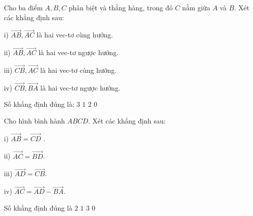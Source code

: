 \begin{ex}%
	Cho ba điểm $A, B,C$ phân biệt và thẳng hàng, trong đó $C$ nằm giữa $A$ và $B$. Xét các khẳng định sau:
	
	i) $\vec{AB}, \vec{AC}$ là hai vec-tơ cùng hướng.
	
	ii) $\vec{AB}, \vec{AC}$ là hai vec-tơ ngược hướng.
	
	iii) $\vec{CB}, \vec{AC}$ là hai vec-tơ cùng hướng.
	
	iv) $\vec{CB}, \vec{BA}$ là hai vec-tơ ngược hướng.
	
	Số khẳng định đúng là:
	\choice
	{\True $3$}
	{$1$}
	{$2$}
	{ $0$}
\end{ex} 

\begin{ex}%
	Cho hình bình hành $ABCD$. Xét các khẳng định sau:
	
	i) $\vec{AB}= \vec{CD}$ .
	
	ii) $\vec{AC}= \vec{BD}$.
	
	iii) $\vec{AD}= \vec{CB}$.
	
	iv) $\vec{AC}= \vec{AD}- \vec{BA}$.
	
	Số khẳng định đúng là
	\choice
	{\True $2$}
	{$1$}
	{$3$}
	{ $0$}
\end{ex} 










